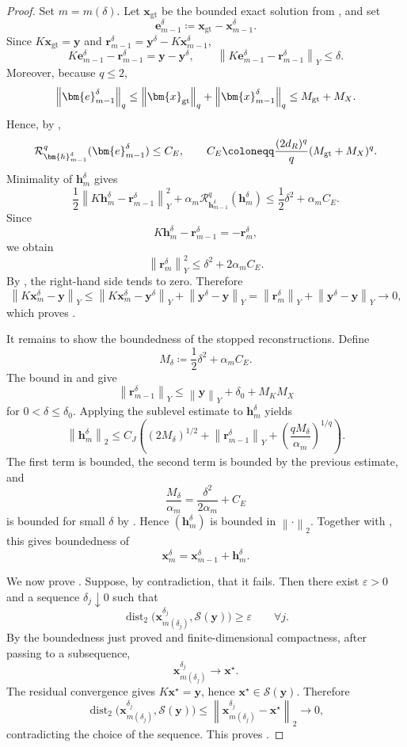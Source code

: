 \documentclass{article}
\theoremstyle{remark}
\newcommand{\gt}{\bm{x}_{\mathrm{gt}}}
\newcommand{\norm}[1]{\left\lVert #1 \right\rVert}
\newcommand{\Rreg}{\mathcal{R}}
\newcommand{\Ssol}{\mathcal{S}}
\newcommand{\bx}{{\bm{x}}}
\newcommand{\by}{{\bm{y}}}
\newcommand{\bh}{{\bm{h}}}
\newcommand{\be}{{\bm{e}}}
\newcommand{\br}{{\bm{r}}}
\begin{document}
\begin{proof}
Set \(m=m(\delta)\). Let \(\gt\) be the bounded exact solution from
, and set
\[
\be_{m-1}^\delta\coloneqq \gt-\bx_{m-1}^\delta .
\]
Since \(K\gt=\by\) and
\(\br_{m-1}^\delta=\by^\delta-K\bx_{m-1}^\delta\),
\[
K\be_{m-1}^\delta-\br_{m-1}^\delta
=
\by-\by^\delta,
\qquad
\norm{K\be_{m-1}^\delta-\br_{m-1}^\delta}_Y\le\delta .
\]
Moreover, because \(q\le2\),
\[
\norm{\be_{m-1}^\delta}_q
\le
\norm{\gt}_q+\norm{\bx_{m-1}^\delta}_q
\le
M_{\rm gt}+M_X .
\]
Hence, by ,
\[
\Rreg_{\bh_{m-1}^\delta}^q(\be_{m-1}^\delta)
\le
C_E,
\qquad
C_E\coloneqq
\frac{(2d_R)^q}{q}(M_{\rm gt}+M_X)^q .
\]
Minimality of \(\bh_m^\delta\) gives
\[
\frac12\norm{K\bh_m^\delta-\br_{m-1}^\delta}_Y^2
+
\alpha_m\Rreg_{\bh_{m-1}^\delta}^q(\bh_m^\delta)
\le
\frac12\delta^2+\alpha_m C_E .
\]
Since
\[
K\bh_m^\delta-\br_{m-1}^\delta
=
-\br_m^\delta,
\]
we obtain
\begin{equation*}
\norm{\br_m^\delta}_Y^2
\le
\delta^2+2\alpha_m C_E .
\end{equation*}
By , the right-hand side tends to zero. Therefore
\[
\norm{K\bx_m^\delta-\by}_Y
\le
\norm{K\bx_m^\delta-\by^\delta}_Y
+\norm{\by^\delta-\by}_Y
=
\norm{\br_m^\delta}_Y
+\norm{\by^\delta-\by}_Y
\to0,
\]
which proves .

It remains to show the boundedness of the stopped reconstructions. Define
\[
M_\delta\coloneqq \frac12\delta^2+\alpha_m C_E .
\]
The bound in  and  give
\[
\norm{\br_{m-1}^\delta}_Y
\le
\norm{\by}_Y+\delta_0+M_KM_X
\]
for \(0<\delta\le\delta_0\). Applying the sublevel estimate
 to \(\bh_m^\delta\) yields
\[
\norm{\bh_m^\delta}_2
\le
C_J\left(
(2M_\delta)^{1/2}
+\norm{\br_{m-1}^\delta}_Y
+\left(\frac{qM_\delta}{\alpha_m}\right)^{1/q}
\right).
\]
The first term is bounded, the second term is bounded by the previous estimate,
and
\[
\frac{M_\delta}{\alpha_m}
=
\frac{\delta^2}{2\alpha_m}+C_E
\]
is bounded for small \(\delta\) by . Hence
\((\bh_m^\delta)\) is bounded in \(\norm{\cdot}_2\). Together with
, this gives boundedness of
\[
\bx_m^\delta=\bx_{m-1}^\delta+\bh_m^\delta .
\]

We now prove . Suppose, by contradiction, that it
fails. Then there exist \(\varepsilon>0\) and a sequence
\(\delta_j\downarrow0\) such that
\[
\operatorname{dist}_2
\bigl(\bx_{m(\delta_j)}^{\delta_j},\Ssol(\by)\bigr)
\ge\varepsilon
\qquad\forall j.
\]
By the boundedness just proved and finite-dimensional compactness, after passing
to a subsequence,
\[
\bx_{m(\delta_j)}^{\delta_j}\to\bx^\star .
\]
The residual convergence  gives
\(K\bx^\star=\by\), hence \(\bx^\star\in\Ssol(\by)\). Therefore
\[
\operatorname{dist}_2
\bigl(\bx_{m(\delta_j)}^{\delta_j},\Ssol(\by)\bigr)
\le
\norm{\bx_{m(\delta_j)}^{\delta_j}-\bx^\star}_2
\to0,
\]
contradicting the choice of the sequence. This proves
.
\end{proof}
\end{document}
